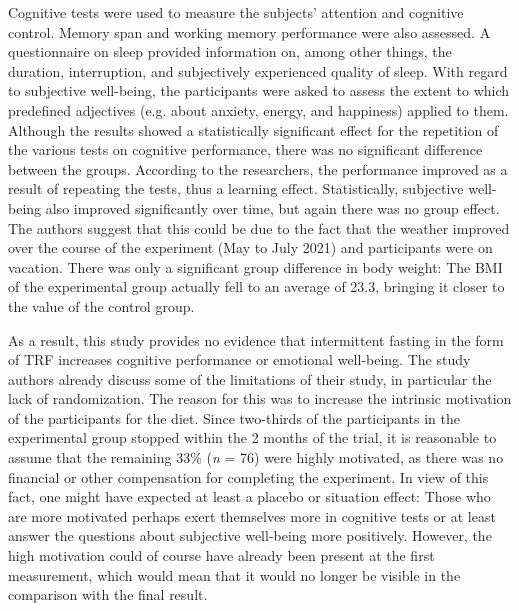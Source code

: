 \documentclass[authordate, empirical]{jote-new-article}
\begin{document}
Cognitive tests were used to measure the subjects' attention and cognitive control. Memory span and working memory performance were also assessed. A questionnaire on sleep provided information on, among other things, the duration, interruption, and subjectively experienced quality of sleep. With regard to subjective well-being, the participants were asked to assess the extent to which predefined adjectives (e.g. about anxiety, energy, and happiness) applied to them. Although the results showed a statistically significant effect for the repetition of the various tests on cognitive performance, there was no significant difference between the groups. According to the researchers, the performance improved as a result of repeating the tests, thus a learning effect. Statistically, subjective well-being also improved significantly over time, but again there was no group effect. The authors suggest that this could be due to the fact that the weather improved over the course of the experiment (May to July 2021) and participants were on vacation. There was only a significant group difference in body weight: The BMI of the experimental group actually fell to an average of 23.3, bringing it closer to the value of the control group.







As a result, this study provides no evidence that intermittent fasting in the form of TRF increases cognitive performance or emotional well-being. The study authors already discuss some of the limitations of their study, in particular the lack of randomization. The reason for this was to increase the intrinsic motivation of the participants for the diet. Since two-thirds of the participants in the experimental group stopped within the 2 months of the trial, it is reasonable to assume that the remaining 33\% (\emph{n} = 76) were highly motivated, as there was no financial or other compensation for completing the experiment. In view of this fact, one might have expected at least a placebo or situation effect: Those who are more motivated perhaps exert themselves more in cognitive tests or at least answer the questions about subjective well-being more positively. However, the high motivation could of course have already been present at the first measurement, which would mean that it would no longer be visible in the comparison with the final result.
\end{document}

